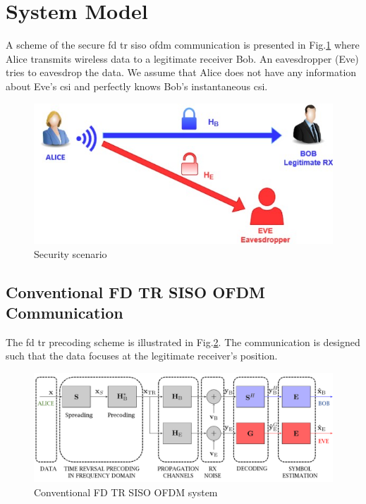 \section{System Model}
A scheme of the secure \gls{fd} \gls{tr} \gls{siso} \gls{ofdm} communication is presented in Fig.\ref{fig:A_B_E_scheme} where Alice transmits wireless data to a legitimate receiver Bob. An eavesdropper (Eve) tries to eavesdrop the data. We assume that Alice does not have any information about Eve's \gls{csi} and perfectly knows Bob's instantaneous \gls{csi}. 
\begin{figure}[h!]
    \centering
    \includegraphics[width=.5\linewidth]{img/a_b_e_scheme.jpg}
    \caption{Security scenario}
    \label{fig:A_B_E_scheme}
\end{figure} 






\subsection{Conventional FD TR SISO OFDM Communication}
The \gls{fd} \gls{tr} precoding scheme is illustrated in Fig.\ref{fig:TR_FD_classical}.  The communication is designed such that the data focuses at the legitimate receiver's position. 
\begin{figure}[h!]
    \centering
    \includegraphics[width=1\linewidth]{img/Capture.PNG}
    \caption{Conventional FD TR SISO OFDM system}
    \label{fig:TR_FD_classical}
\end{figure} 


